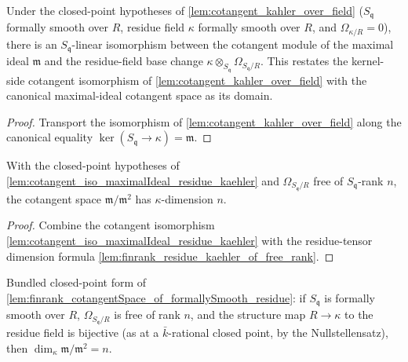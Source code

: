 \begin{lemma}
  \label{lem:cotangent_iso_maximalIdeal_residue_kaehler}
  Under the closed-point hypotheses of \cref{lem:cotangent_kahler_over_field}
  (\(S_{\mathfrak q}\) formally smooth over \(R\), residue field \(\kappa\) formally
  smooth over \(R\), and \(\Omega_{\kappa/R} = 0\)), there is an
  \(S_{\mathfrak q}\)-linear isomorphism between the cotangent module of the maximal
  ideal \(\mathfrak m\) and the residue-field base change
  \(\kappa \otimes_{S_{\mathfrak q}} \Omega_{S_{\mathfrak q}/R}\). This restates the
  kernel-side cotangent isomorphism of \cref{lem:cotangent_kahler_over_field} with the
  canonical maximal-ideal cotangent space as its domain.
\end{lemma}

\begin{proof}
  Transport the isomorphism of
  \cref{lem:cotangent_kahler_over_field} along the canonical equality
  \(\ker(S_{\mathfrak q} \to \kappa) = \mathfrak m\).
\end{proof}

\begin{lemma}\leanok
  \label{lem:finrank_cotangentSpace_of_formallySmooth_residue}
  With the closed-point hypotheses of
  \cref{lem:cotangent_iso_maximalIdeal_residue_kaehler} and
  \(\Omega_{S_{\mathfrak q}/R}\) free of \(S_{\mathfrak q}\)-rank \(n\), the cotangent
  space \(\mathfrak m / \mathfrak m^2\) has \(\kappa\)-dimension \(n\).
\end{lemma}

\begin{proof}
  Combine the cotangent isomorphism
  \cref{lem:cotangent_iso_maximalIdeal_residue_kaehler} with the residue-tensor
  dimension formula \cref{lem:finrank_residue_kaehler_of_free_rank}.
\end{proof}

\begin{lemma}\leanok
  \label{lem:finrank_cotangentSpace_of_bijective_residue}
  Bundled closed-point form of
  \cref{lem:finrank_cotangentSpace_of_formallySmooth_residue}: if \(S_{\mathfrak q}\)
  is formally smooth over \(R\), \(\Omega_{S_{\mathfrak q}/R}\) is free of rank \(n\),
  and the structure map \(R \to \kappa\) to the residue field is bijective (as at a
  \(\bar k\)-rational closed point, by the Nullstellensatz), then
  \(\dim_\kappa \mathfrak m/\mathfrak m^2 = n\).
\end{lemma}

